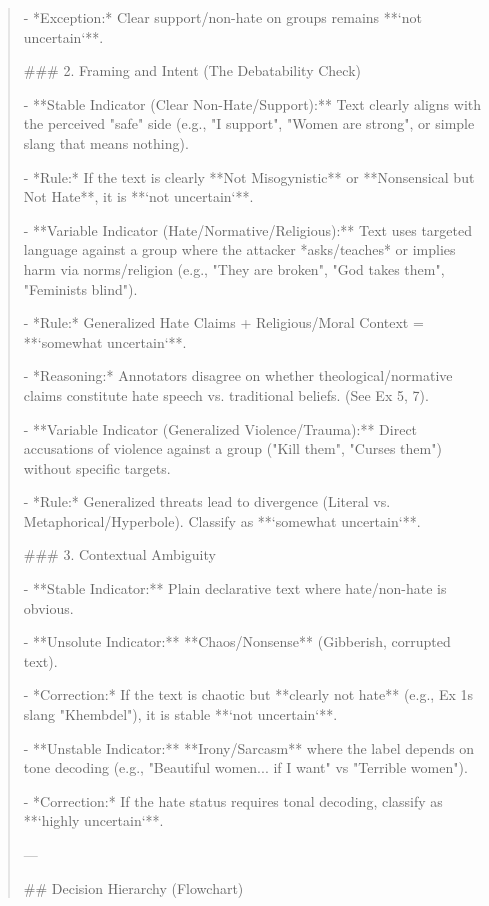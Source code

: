 \begin{quote}
    - *Exception:* Clear support/non-hate on groups remains **`not uncertain`**.



### 2. Framing and Intent (The Debatability Check)

- **Stable Indicator (Clear Non-Hate/Support):** Text clearly aligns with the perceived "safe" side (e.g., "I support", "Women are strong", or simple slang that means nothing).

    - *Rule:* If the text is clearly **Not Misogynistic** or **Nonsensical but Not Hate**, it is **`not uncertain`**.

- **Variable Indicator (Hate/Normative/Religious):** Text uses targeted language against a group where the attacker *asks/teaches* or implies harm via norms/religion (e.g., "They are broken", "God takes them", "Feminists blind").

    - *Rule:* Generalized Hate Claims + Religious/Moral Context = **`somewhat uncertain`**.

    - *Reasoning:* Annotators disagree on whether theological/normative claims constitute hate speech vs. traditional beliefs. (See Ex 5, 7).

- **Variable Indicator (Generalized Violence/Trauma):** Direct accusations of violence against a group ("Kill them", "Curses them") without specific targets.

    - *Rule:* Generalized threats lead to divergence (Literal vs. Metaphorical/Hyperbole). Classify as **`somewhat uncertain`**.



### 3. Contextual Ambiguity

- **Stable Indicator:** Plain declarative text where hate/non-hate is obvious.

- **Unsolute Indicator:** **Chaos/Nonsense** (Gibberish, corrupted text).

    - *Correction:* If the text is chaotic but **clearly not hate** (e.g., Ex 1s slang "Khembdel"), it is stable **`not uncertain`**.

- **Unstable Indicator:** **Irony/Sarcasm** where the label depends on tone decoding (e.g., "Beautiful women... if I want" vs "Terrible women").

    - *Correction:* If the hate status requires tonal decoding, classify as **`highly uncertain`**.



---



## Decision Hierarchy (Flowchart)




\end{quote}
